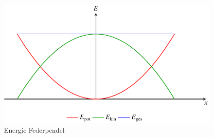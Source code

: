 %
%
%
\begin{figure}
\centering
\includegraphics{papers/fourier/images/hmo_energiediagramm.pdf}
\caption{Energie Federpendel\label{fourier:fig:hmo_energiediagramm}}
\end{figure}